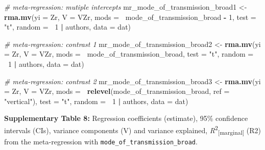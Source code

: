 \documentclass[
]{article}
\newenvironment{Shaded}{\begin{snugshade}}{\end{snugshade}}
\newcommand{\CommentTok}[1]{\textcolor[rgb]{0.56,0.35,0.01}{\textit{#1}}}
\newcommand{\DataTypeTok}[1]{\textcolor[rgb]{0.13,0.29,0.53}{#1}}
\newcommand{\DecValTok}[1]{\textcolor[rgb]{0.00,0.00,0.81}{#1}}
\newcommand{\KeywordTok}[1]{\textcolor[rgb]{0.13,0.29,0.53}{\textbf{#1}}}
\newcommand{\NormalTok}[1]{#1}
\newcommand{\OperatorTok}[1]{\textcolor[rgb]{0.81,0.36,0.00}{\textbf{#1}}}
\newcommand{\StringTok}[1]{\textcolor[rgb]{0.31,0.60,0.02}{#1}}
\begin{document}
\begin{Shaded}
\begin{Highlighting}[]
\CommentTok{# meta-regression: mutiple intercepts}
\NormalTok{mr_mode_of_transmission_broad1 <-}\StringTok{ }\KeywordTok{rma.mv}\NormalTok{(}\DataTypeTok{yi =}\NormalTok{ Zr, }\DataTypeTok{V =}\NormalTok{ VZr, }\DataTypeTok{mods =} \OperatorTok{~}\NormalTok{mode_of_transmission_broad }\OperatorTok{-}\StringTok{ }
\StringTok{    }\DecValTok{1}\NormalTok{, }\DataTypeTok{test =} \StringTok{"t"}\NormalTok{, }\DataTypeTok{random =} \OperatorTok{~}\DecValTok{1} \OperatorTok{|}\StringTok{ }\NormalTok{authors, }\DataTypeTok{data =}\NormalTok{ dat)}

\CommentTok{# meta-regression: contrast 1}
\NormalTok{mr_mode_of_transmission_broad2 <-}\StringTok{ }\KeywordTok{rma.mv}\NormalTok{(}\DataTypeTok{yi =}\NormalTok{ Zr, }\DataTypeTok{V =}\NormalTok{ VZr, }\DataTypeTok{mods =} \OperatorTok{~}\NormalTok{mode_of_transmission_broad, }
    \DataTypeTok{test =} \StringTok{"t"}\NormalTok{, }\DataTypeTok{random =} \OperatorTok{~}\DecValTok{1} \OperatorTok{|}\StringTok{ }\NormalTok{authors, }\DataTypeTok{data =}\NormalTok{ dat)}

\CommentTok{# meta-regression: contrast 2}
\NormalTok{mr_mode_of_transmission_broad3 <-}\StringTok{ }\KeywordTok{rma.mv}\NormalTok{(}\DataTypeTok{yi =}\NormalTok{ Zr, }\DataTypeTok{V =}\NormalTok{ VZr, }\DataTypeTok{mods =} \OperatorTok{~}\KeywordTok{relevel}\NormalTok{(mode_of_transmission_broad, }
    \DataTypeTok{ref =} \StringTok{"vertical"}\NormalTok{), }\DataTypeTok{test =} \StringTok{"t"}\NormalTok{, }\DataTypeTok{random =} \OperatorTok{~}\DecValTok{1} \OperatorTok{|}\StringTok{ }\NormalTok{authors, }\DataTypeTok{data =}\NormalTok{ dat)}
\end{Highlighting}
\end{Shaded}

\textbf{Supplementary Table 8:} Regression coefficients (estimate), 95\%
confidence intervals (CIs), variance components (V) and variance
explained, \emph{R}\textsuperscript{2}\textsubscript{{[}marginal{]}}
(R2) from the meta-regression with
\texttt{mode\_of\_transmission\_broad}.
\end{document}
